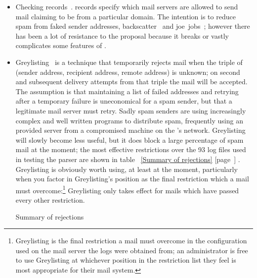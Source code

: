 \documentclass[a4paper,12pt,draft]{article}
\newcommand{\refwithpage}[1]{%
    \empty{}\ref{#1} [page~\pageref{#1}]%
}
\newcommand{\numberOFlogFILES}[0]{%
    93%
}
\begin{document}
\begin{itemize}

    \item Checking \SPF{} records~\cite{openspf, Wikipedia-spf}.
        \SPF{}\label{spf introduction} records specify which mail servers
        are allowed to send mail claiming to be from a particular domain.
        The intention is to reduce spam from faked sender addresses,
        backscatter~\cite{postfix-backscatter} and
        joe~jobs~\cite{Wikipedia-joe-job}; however there has been a lot of
        resistance to the proposal because it breaks or vastly complicates
        some features of \SMTP{}\@.

    \item Greylisting~\cite{greylisting} is a technique that temporarily
        rejects mail when the triple of (sender address, recipient address,
        remote \IP{} address) is unknown; on second and subsequent delivery
        attempts from that triple the mail will be accepted.  The
        assumption is that maintaining a list of failed addresses and
        retrying after a temporary failure is uneconomical for a spam
        sender, but that a legitimate mail server must retry.  Sadly spam
        senders are using increasingly complex and well written programs to
        distribute spam, frequently using an \ISP{} provided \SMTP{} server
        from a compromised machine on the \ISP{}'s network.  Greylisting
        will slowly become less useful, but it does block a large
        percentage of spam mail at the moment; the most effective
        restrictions over the \numberOFlogFILES{} log files used in testing
        the parser are shown in table~\refwithpage{Summary of rejections}.
        Greylisting is obviously worth using, at least at the moment,
        particularly when you factor in Greylisting's position as the final
        restriction which a mail must overcome:\footnote{Greylisting is the
        final restriction a mail must overcome in the configuration used on
        the mail server the logs were obtained from; an administrator is
        free to use Greylisting at whichever position in the restriction
        list they feel is most appropriate for their mail system.}
        Greylisting only takes effect for mails which have passed every
        other restriction.

        \begin{table}[ht]
            \caption{Summary of rejections}\label{Summary of rejections}
            
        \end{table}


\end{itemize}
\end{document}
